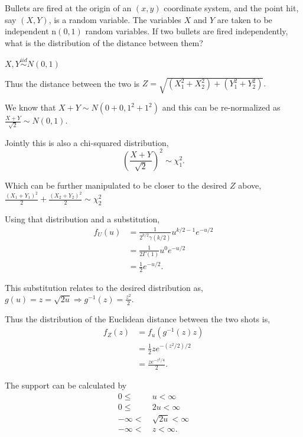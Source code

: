 \documentclass[12pt,letterpaper]{exam}
\begin{document}
\begin{questions}
	\setcounter{question}{51}
	\question 
	Bullets are fired at the origin of an \((x, y)\) coordinate system, and the point hit, say \((X, Y )\), is a random variable. The variables \(X\) and \(Y\) are taken to be independent n\((0, 1)\) random variables. If two bullets are fired independently, what is the distribution of the distance between them?
	
	\begin{solution}
		\(X,Y \overset{iid}{\sim} N(0,1)\)
		
		Thus the distance between the two is
		\(Z = \sqrt{(X^2_1+X^2_2)+(Y^2_1+Y^2_2)}.\)
		
		We know that 
		\(X+Y \sim N(0+0,1^2+1^2)\)
		and this can be re-normalized as
		\(\frac{X+Y}{\sqrt{2}} \sim N(0,1)\).
		
		Jointly this is also a chi-squared distribution,
		\[\left(\frac{X+Y}{\sqrt{2}}\right)^2 \sim \chi^2_1.\]
		
		Which can be further manipulated to be closer to the desired \(Z\) above, 
		\(\frac{(X_1+Y_1)^2}{2} + \frac{(X_2+Y_2)^2}{2} \sim \chi^2_2\)
		
		Using that distribution and a substitution,
		\begin{align*}
			f_U(u) 
			&= \frac{1}{2^{k/2}\gamma(k/2)} u^{k/2-1} e^{-u/2} \\
			&= \frac{1}{2\Gamma(1)} u^0 e^{-u/2} \\
			&= \frac{1}{2} e^{-u/2}.
		\end{align*}
		
		This substitution relates to the desired distribution as, 
		\(g(u) = z = \sqrt{2u} \Rightarrow g^{-1}(z) = \frac{z^2}{2}. \)
		
		Thus the distribution of the Euclidean distance between the two shots is,		
		\begin{align*}
			f_Z(z)
			 &= f_u(g^{-1}(z) z) \\
			 &= \frac{1}{2}ze^{-(z^2/2)/2} \\
			 &= \frac{ze^{-z^2/4}}{2}.
		\end{align*}
		
		The support can be calculated by
		\begin{align*}
			0 \leq&\ u < \infty \\
			0 \leq&\ 2u < \infty \\
			-\infty <&\ \sqrt{2u} < \infty \\
			-\infty <&\ z < \infty.
		\end{align*}
		
	\end{solution}

\end{questions}
\end{document}
